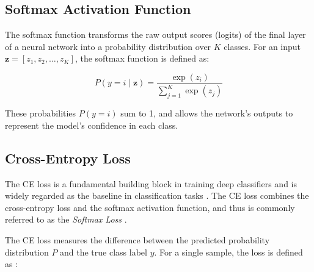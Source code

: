 

\subsection{Softmax Activation Function}
\label{sec:softmax}
The softmax function transforms the raw output scores (logits) of the final layer of a neural network into a probability distribution over \( K \) classes. For an input \( \mathbf{z} = [z_1, z_2, \dots, z_K] \), the softmax function is defined as:

\begin{equation}
    \label{eq:softmax}
    P(y = i \mid \mathbf{z}) = \frac{\exp(z_i)}{\sum_{j=1}^{K} \exp(z_j)}
\end{equation}

\noindent These probabilities $P(y=i)$ sum to 1, and allows the network's outputs to represent the model's confidence in each class.

\subsection{Cross-Entropy Loss}
\label{sec:ce_loss}
The CE loss is a fundamental building block in training deep classifiers and is widely regarded as the baseline in classification tasks \cite{zhang2023deep, cs231n, pytorch_crossentropy}. The CE loss combines the cross-entropy loss and the softmax activation function, and thus is commonly referred to as the \emph{Softmax Loss} \cite{zhang2023dive,Goodfellow-et-al-2016,zhang2023deep}. 

The CE loss measures the difference between the predicted probability distribution $P$ and the true class label $y$. For a single sample, the loss is defined as \cite{zhang2023dive,cs231n}:

